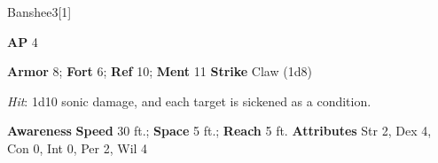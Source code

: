 \begin{monsection}{Banshee}{3}[1]
\vspace{-1em}\vspace{-1em}
\begin{spellcontent}
\begin{spelltargetinginfo}
{\textbf{AP} 4}

\pari \textbf{Armor} 8;
\textbf{Fort} 6;
\textbf{Ref} 10;
\textbf{Ment} 11
\pari \textbf{Strike} Claw  (1d8)



\end{spelltargetinginfo}


\begin{spelleffects}

\pari

\par


\par \textit{Hit}: 1d10 sonic damage, and each target is sickened as a condition.


\end{spelleffects}

\end{spellcontent}

\begin{monsterfooter}
\pari \textbf{Awareness} 
\pari \textbf{Speed} 30 ft.;
\textbf{Space} 5 ft.;
\textbf{Reach} 5 ft.
\pari \textbf{Attributes}
Str 2,
Dex 4,
Con 0,
Int 0,
Per 2,
Wil 4
\end{monsterfooter}
\end{monsection}



